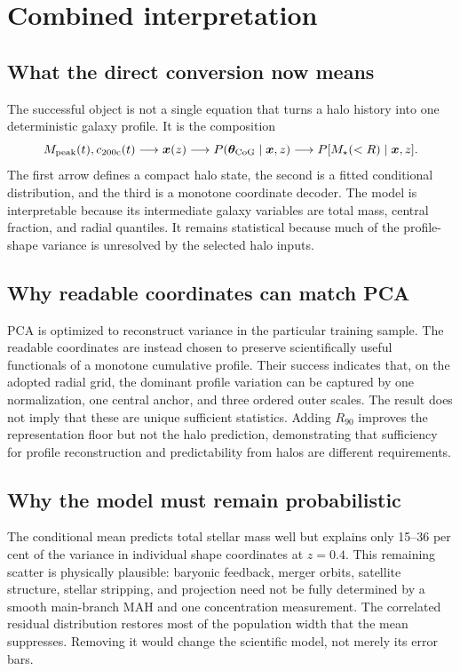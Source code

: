 \section{Combined interpretation}
\label{sec:interpretation}

\subsection{What the direct conversion now means}

The successful object is not a single equation that turns a halo history into
one deterministic galaxy profile. It is the composition
\begin{equation}
  M_{\mathrm{peak}}(t),c_{200\mathrm{c}}(t)
  \longrightarrow \bm{x}(z)
  \longrightarrow P(\bm{\theta}_{\mathrm{CoG}}\mid\bm{x},z)
  \longrightarrow P[M_\star(<R)\mid\bm{x},z].
  \label{eq:final_composition}
\end{equation}
The first arrow defines a compact halo state, the second is a fitted conditional
distribution, and the third is a monotone coordinate decoder. The model is
interpretable because its intermediate galaxy variables are total mass,
central fraction, and radial quantiles. It remains statistical because much of
the profile-shape variance is unresolved by the selected halo inputs.

\subsection{Why readable coordinates can match PCA}

PCA is optimized to reconstruct variance in the particular training sample.
The readable coordinates are instead chosen to preserve scientifically useful
functionals of a monotone cumulative profile. Their success indicates that, on
the adopted radial grid, the dominant profile variation can be captured by one
normalization, one central anchor, and three ordered outer scales. The result
does not imply that these are unique sufficient statistics. Adding $R_{90}$
improves the representation floor but not the halo prediction, demonstrating
that sufficiency for profile reconstruction and predictability from halos are
different requirements.

\subsection{Why the model must remain probabilistic}

The conditional mean predicts total stellar mass well but explains only
15--36 per cent of the variance in individual shape coordinates at $z=0.4$.
This remaining scatter is physically plausible: baryonic feedback, merger
orbits, satellite structure, stellar stripping, and projection need not be
fully determined by a smooth main-branch MAH and one concentration measurement.
The correlated residual distribution restores most of the population width
that the mean suppresses. Removing it would change the scientific model, not
merely its error bars.

